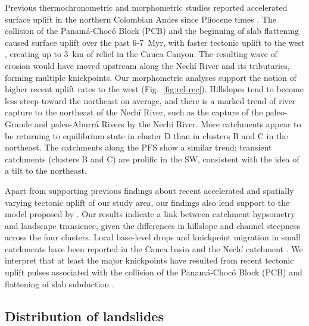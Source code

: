 \documentclass[draft]{agujournal2019}
\begin{document}
\par Previous thermochronometric and morphometric studies reported accelerated surface uplift in the northern Colombian Andes since Pliocene times \cite{restrepo2019, Noriega2020, perez2021, perez2022, ott2023}. The collision of the Panamá-Chocó Block (PCB) and the beginning of slab flattening caused surface uplift over the past 6-7~Myr, with faster tectonic uplift to the west \cite{perez2021, ott2023}, creating up to 3~km of relief in the Cauca Canyon. The resulting wave of erosion would have moved upstream along the Nechí River and its tributaries, forming multiple knickpoints. Our morphometric analyses support the notion of higher recent uplift rates to the west (Fig.~\ref{fig:rel-rec}). %
Hillslopes tend to become less steep toward the northeast on average, and there is a marked trend of river capture to the northeast of the Nechí River, such as the capture of the paleo-Grande and paleo-Aburrá Rivers by the Nechí River. More catchments appear to be returning to equilibrium state in cluster D than in clusters B and C in the northeast. The catchments along the PFS show a similar trend; transient catchments (clusters B and C) are prolific in the SW, consistent with the idea of a tilt to the northeast.

\par Apart from supporting previous findings about recent accelerated and spatially varying tectonic uplift of our study area, our findings also lend support to the model proposed by . Our results indicate a link between catchment hypsometry and landscape transience, given the differences in hillslope and channel steepness across the four clusters. Local base-level drops and knickpoint migration in small catchments have been reported in the Cauca basin and the Nechí catchment \cite{perez2021,aristizabal2008,Noriega2020}. We interpret that at least the major knickpoints have resulted from recent tectonic uplift pulses associated with the collision of the Panamá-Chocó Block (PCB) and flattening of slab subduction \cite{ott2023}.

\subsection{Distribution of landslides}
\end{document}
